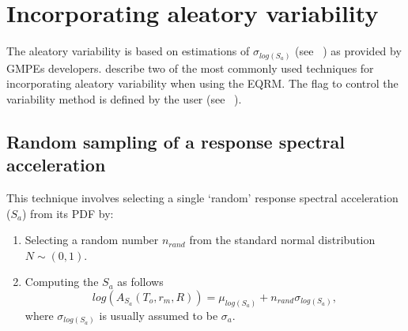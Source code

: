 \section{Incorporating aleatory variability}
\label{attn:uncertainty}

The aleatory variability is based on estimations of
$\sigma_{log(S_a)}$ (see ~) as provided by GMPEs
developers.
 describe
two of the most commonly used techniques for incorporating aleatory
variability when using the EQRM. The flag to control the variability
method is defined by the user (see ~).

\subsection{Random sampling of a response spectral acceleration}
\label{attn:uncert-randomchoice}

This technique involves selecting a single `random' response
spectral acceleration ($S_a$)
from its PDF by:
\begin{enumerate}
\item Selecting a random number $n_{rand}$ from the standard
normal distribution $ N \sim (0,1)$. \item Computing the $S_a$ as
follows
\begin{equation}
\label{attn:attn-var} log(A_{S_a}(T_o,r_m,R)) = \mu_{log(S_a)} +
n_{rand} \sigma_{log(S_a)},
\end{equation}
where $\sigma_{log(S_a)}$ is usually assumed to be $\sigma_a$.
\end{enumerate}

